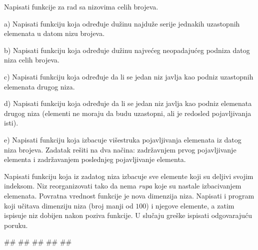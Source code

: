 \begin{Exercise}[label=pv.bez_resenja_6] 
Napisati funkcije za rad sa nizovima celih brojeva. 
\begin{description}
\item{a)} Napisati funkciju koja određuje dužinu najduže serije jednakih uzastopnih elemenata
u datom nizu brojeva.
\item{b)} Napisati funkciju koja određuje dužinu najvećeg neopadajućeg podniza datog niza celih
  brojeva. 
\item{c)} Napisati funkciju koja određuje da li se jedan niz javlja kao podniz uzastopnih elemenata drugog niza.
\item{d)} Napisati funkciju koja određuje da li se jedan niz javlja kao podniz elemenata drugog niza (elementi ne moraju da budu uzastopni, ali je redosled pojavljivanja isti).  
\item{e)} Napisati funkciju koja izbacuje višestruka pojavljivanja elemenata iz datog niza
  brojeva. Zadatak rešiti na dva načina: zadržavnjem prvog pojavljivanje elementa i zadržavanjem poslednjeg pojavljivanje elementa.  
\end{description}
\end{Exercise}
\begin{Answer}[ref=pv.bez_resenja_6]
\end{Answer}


\begin{Exercise}[label=vp.bez_resenja_2] 
Napisati funkciju koja iz zadatog niza izbacuje sve elemente koji su deljivi svojim indeksom. Niz reorganizovati tako da nema \emph{rupa} koje su nastale izbacivanjem elemenata. Povratna vrednost funkcije je nova dimenzija niza. Napisati i program koji učitava dimenziju niza (broj manji od $100$) i njegove elemente, a zatim ispisuje niz dobijen nakon poziva funkcije. U slučaju greške ispisati odgovarajuću poruku. 
\begin{miditest}
\begin{upotreba}{1}
#\naslovInt#
##
##
##
##
\end{upotreba}
\end{miditest}
\end{Exercise}
\begin{Answer}[ref=vp.bez_resenja_2]
\end{Answer}


